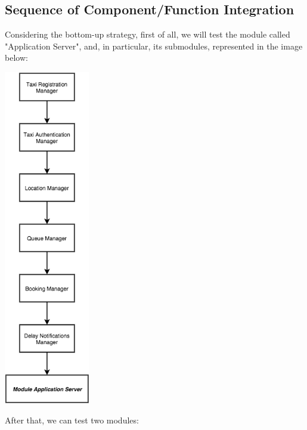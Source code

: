\subsection{Sequence of Component/Function Integration}
Considering the bottom-up strategy, first of all, we will test the module called "Application Server", and, in particular, its submodules, represented in the image below:
    \begin{center}
	    \includegraphics[width=0.28\textwidth]{./images/ModuleApplicationServer.png}~\\[1.5cm] 
    \end{center}	
After that, we can test two modules:

